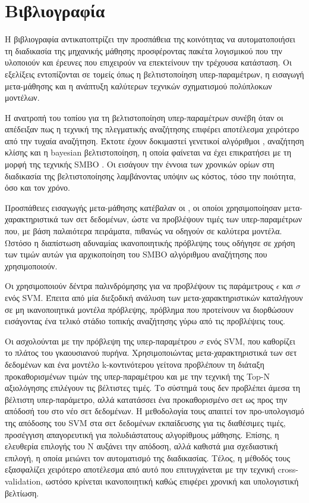 \chapter{Βιβλιογραφία}
Η βιβλιογραφία αντικατοπτρίζει την προσπάθεια της κοινότητας να αυτοματοποιήσει τη διαδικασία της μηχανικής μάθησης προσφέροντας πακέτα λογισμικού που την υλοποιούν και έρευνες που επιχειρούν να επεκτείνουν την τρέχουσα κατάσταση. Οι εξελίξεις εντοπίζονται σε τομείς όπως η βελτιστοποίηση υπερ-παραμέτρων, η εισαγωγή μετα-μάθησης και η ανάπτυξη καλύτερων τεχνικών σχηματισμού πολύπλοκων μοντέλων.

Η ανατροπή του τοπίου για τη βελτιστοποίηση υπερ-παραμέτρων συνέβη όταν οι \citet{Bergstra:2012:RSH:2188385.2188395} απέδειξαν πως η τεχνική της πλεγματικής αναζήτησης επιφέρει αποτέλεσμα χειρότερο από την τυχαία αναζήτηση. Έκτοτε έχουν δοκιμαστεί γενετικοί αλγόριθμοι \citep{1554741}, αναζήτηση κλίσης \citep{wassenberg} και η bayesian βελτιστοποίηση, η οποία φαίνεται να έχει επικρατήσει με τη μορφή της τεχνικής SMBO \citep{DBLP:journals/corr/abs-1208-3719}. Οι \citet{HutHooLeyMur10} εισάγουν την έννοια των χρονικών ορίων στη διαδικασία της βελτιστοποίησης λαμβάνοντας υπόψιν ως κόστος, τόσο την ποιότητα, όσο και τον χρόνο.

Προσπάθειες εισαγωγής μετα-μάθησης κατέβαλαν οι \citet{Feurer:2014:UMI:3015544.3015549}, οι οποίοι χρησιμοποίησαν μετα-χαρακτηριστικά των σετ δεδομένων, ώστε να προβλέψουν τιμές των υπερ-παραμέτρων που, με βάση παλαιότερα πειράματα, πιθανώς να οδηγούν σε καλύτερα μοντέλα. Ωστόσο η διαπίστωση αδυναμίας ικανοποιητικής πρόβλεψης τους οδήγησε σε χρήση των τιμών αυτών για αρχικοποίηση του SMBO αλγόριθμου αναζήτησης που χρησιμοποιούν.  

Οι \citet{kuba2002exploiting} χρησιμοποιούν δέντρα παλινδρόμησης για να προβλέψουν τις παράμετρους $\epsilon$ και $\sigma$ ενός \gls{SVM}. Έπειτα από μία διεξοδική ανάλυση των μετα-χαρακτηριστικών καταλήγουν σε μη ικανοποιητικά μοντέλα πρόβλεψης, πρόβλημα που προτείνουν να διορθώσουν εισάγοντας ένα τελικό στάδιο τοπικής αναζήτησης γύρω από τις προβλέψεις τους.


Οι \citet{Soares2004} ασχολούνται με την πρόβλεψη της υπερ-παραμέτρου $\sigma$ ενός SVM, που καθορίζει το πλάτος του γκαουσιανού πυρήνα. Χρησιμοποιώντας μετα-χαρακτηριστι\-κά των σετ δεδομένων και ένα μοντέλο k-κοντινότερου γείτονα προβλέπουν τη διάταξη προκαθορισμένων τιμών της υπερ-παραμέτρου και με την τεχνική της Top-Ν αξιολόγησης επιλέγουν τις βέλτιστες τιμές. Το σύστημά τους δεν προβλέπει άμεσα τη βέλτιστη υπερ-παράμετρο, αλλά κατατάσσει ένα προκαθορισμένο σετ ως προς την απόδοσή του στο νέο σετ δεδομένων. Η μεθοδολογία τους απαιτεί τον προ-υπολογισμό της απόδοσης του SVM στα σετ δεδομένων εκπαίδευσης για τις διαθέσιμες τιμές, προσέγγιση απαγορευτική για πολυδιάστατους αλγορίθμους μάθησης. Επίσης, η ελευθερία επιλογής του Ν αυξάνει την απόδοση, αλλά καθιστά μια σχεδιαστική επιλογή, η οποία μειώνει τον αυτοματισμό της διαδικασίας. Τέλος, η μέθοδός τους εξασφαλίζει χειρότερο αποτέλεσμα από αυτό που επιτυγχάνεται με την τεχνική cross-validation, ωστόσο κρίνεται ικανοποιητική καθώς επιφέρει χρονική και υπολογιστική βελτίωση. 

